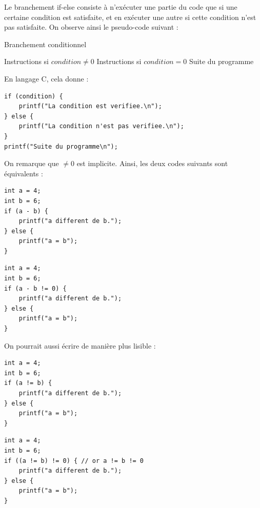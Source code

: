 \documentclass[../../../main.tex]{subfiles}
\begin{document}
Le branchement \textsf{if-else} consiste à n'exécuter une partie du code que si une certaine condition est satisfaite, et en exécuter une autre si cette condition n'est pas satisfaite. On observe ainsi le pseudo-code suivant :
\begin{algorithm}
\caption{Branchement conditionnel}
 {
	Instructions si $condition \neq{0}$
} {
	Instructions si $condition = 0$
}
Suite du programme
\end{algorithm}
En langage C, cela donne :
\begin{verbatim}
if (condition) {
	printf("La condition est verifiee.\n");
} else {
	printf("La condition n'est pas verifiee.\n");
}
printf("Suite du programme\n");
\end{verbatim}
On remarque que $\neq{0}$ est implicite. Ainsi, les deux codes suivants sont équivalents :

\begin{minipage}{0.5\textwidth}
\begin{verbatim}
int a = 4;
int b = 6;
if (a - b) {
	printf("a different de b.");
} else {
	printf("a = b");
}
\end{verbatim}
\end{minipage}
\begin{minipage}{0.5\textwidth}
\begin{verbatim}
int a = 4;
int b = 6;
if (a - b != 0) {
	printf("a different de b.");
} else {
	printf("a = b");
}
\end{verbatim}
\end{minipage}
 
On pourrait aussi écrire de manière plus lisible : 
 
\begin{minipage}{0.5\textwidth}
\begin{verbatim}
int a = 4;
int b = 6;
if (a != b) {
	printf("a different de b.");
} else {
	printf("a = b");
}
\end{verbatim}
\end{minipage}
\begin{minipage}{0.5\textwidth}
\begin{verbatim}
int a = 4;
int b = 6;
if ((a != b) != 0) { // or a != b != 0
	printf("a different de b.");
} else {
	printf("a = b");
}
\end{verbatim}
\end{minipage}
 
\end{document}
